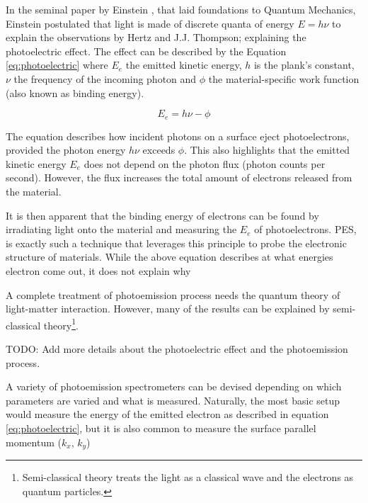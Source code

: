 In the seminal paper by Einstein \cite{einsteinUberErzeugungUnd1905}, that laid foundations to Quantum Mechanics, Einstein postulated that light is made of discrete quanta of energy $E = h\nu$ to explain the observations by Hertz and J.J. Thompson; explaining the photoelectric effect. The effect can be described by the Equation \ref{eq:photoelectric} where $E_e$ the emitted kinetic energy, $h$ is the plank's constant, $\nu$ the frequency of the incoming photon and  $\phi$ the material-specific work function (also known as binding energy). 

\begin{equation}\label{eq:photoelectric}
    E_e = h\nu - \phi
\end{equation}

The equation describes how incident photons on a surface eject photoelectrons, provided the photon energy $h\nu$ exceeds $\phi$. This also highlights that the emitted kinetic energy $E_e$ does not depend on the photon flux (photon counts per second). However, the flux increases the total amount of electrons released from the material.

It is then apparent that the binding energy of electrons can be found by irradiating light onto the material and measuring the $E_e$ of photoelectrons. \gls{PES}, is exactly such a technique that leverages this principle to probe the electronic structure of materials. While the above equation describes at what energies electron come out, it does not explain why 



A complete treatment of photoemission process needs the quantum theory of light-matter interaction. However, many of the results can be explained by semi-classical theory\footnote{Semi-classical theory treats the light as a classical wave and the electrons as quantum particles.}.

TODO: Add more details about the photoelectric effect and the photoemission process.

A variety of photoemission spectrometers can be devised depending on which parameters are varied and what is measured. Naturally, the most basic setup would measure the energy of the emitted electron as described in equation \ref{eq:photoelectric}, but it is also common to measure the surface parallel momentum ($k_x$, $k_y$)


